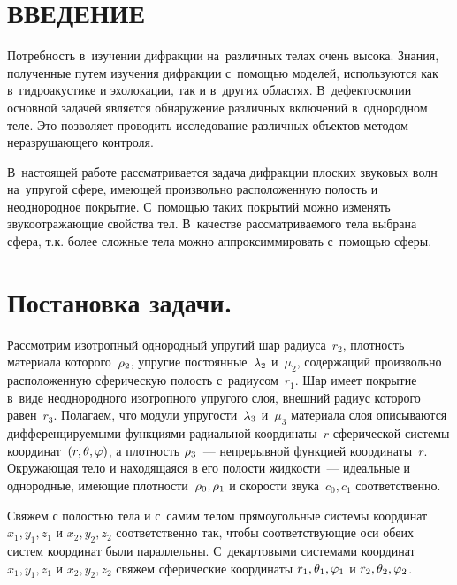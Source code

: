 

\renewcommand{\bibname}{СПИСОК ИСПОЛЬЗОВАННЫХ ИСТОЧНИКОВ}
\renewcommand\refname{СПИСОК ИСПОЛЬЗОВАННЫХ ИСТОЧНИКОВ}

%

\setcounter{page}{5}
\thispagestyle {empty}
\renewcommand{\contentsname}{\centering СОДЕРЖАНИЕ}
\tableofcontents

\newpage
\section*{ВВЕДЕНИЕ}
Потребность в~изучении дифракции на~различных телах очень высока. Знания, полученные путем изучения дифракции с~помощью моделей, используются как в~гидроакустике и эхолокации, так и в~других областях. В~дефектоскопии основной задачей является обнаружение различных включений в~однородном теле. Это позволяет проводить исследование различных объектов методом неразрушающего контроля.

В~настоящей работе рассматривается задача дифракции плоских звуковых волн на~упругой сфере, имеющей произвольно расположенную полость и неоднородное покрытие. С~помощью таких покрытий можно изменять звукоотражающие свойства тел. В~качестве рассматриваемого тела выбрана сфера, т.к. более сложные тела можно аппроксиммировать с~помощью сферы. 


\newpage
\section{Постановка задачи.} Рассмотрим изотропный однородный упругий шар радиуса~$r_2$, плотность материала которого~$\rho_2$, упругие постоянные~$\lambda_2$ и~$\mu_2$, содержащий произвольно расположенную сферическую полость с~радиусом~$r_1$. Шар имеет покрытие в~виде неоднородного изотропного упругого слоя, внешний радиус которого равен~$r_3$. Полагаем, что модули упругости~$\lambda_3$ и~$\mu_3$ материала слоя описываются дифференцируемыми функциями радиальной координаты~$r$ сферической системы координат~$(r, \theta, \varphi)$, а плотность $\rho_3$~--- непрерывной функцией координаты~$r$.  Окружающая тело и находящаяся в его полости жидкости~--- идеальные и однородные, имеющие плотности~$\rho_0, \rho_1$ и скорости звука~$c_0, c_1$ соответственно. 

Свяжем с полостью тела и с~самим телом прямоугольные системы координат $x_1, y_1, z_1$ и $x_2, y_2, z_2$ соответственно так, чтобы соответствующие оси обеих систем координат были параллельны. С~декартовыми системами координат $x_1, y_1, z_1$ и $x_2, y_2, z_2$ свяжем сферические координаты $r_1, \theta_1, \varphi_1$ и $r_2, \theta_2, \varphi_2$.

